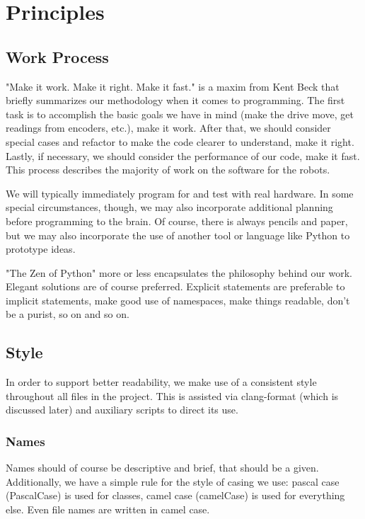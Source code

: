 \section{Principles}
\subsection{Work Process}
"Make it work. Make it right. Make it fast." \cite{bib:makeitworkmakeitright} is a maxim from Kent Beck that briefly summarizes our methodology when it comes to programming. The first task is to accomplish the basic goals we have in mind (make the drive move, get readings from encoders, etc.), make it work. After that, we should consider special cases and refactor to make the code clearer to understand, make it right. Lastly, if necessary, we should consider the performance of our code, make it fast. This process describes the majority of work on the software for the robots. 

We will typically immediately program for and test with real hardware. In some special circumstances, though, we may also incorporate additional planning before programming to the brain. Of course, there is always pencils and paper, but we may also incorporate the use of another tool or language like Python to prototype ideas. 

 "The Zen of Python" \cite{bib:pythonzen} more or less encapsulates the philosophy behind our work. Elegant solutions are of course preferred. Explicit statements are preferable to implicit statements, make good use of namespaces, make things readable, don't be a purist, so on and so on. 

\subsection{Style}
In order to support better readability, we make use of a consistent style throughout all files in the project. This is assisted via clang-format (which is discussed later) and auxiliary scripts to direct its use. 

\subsubsection{Names}
Names should of course be descriptive and brief, that should be a given. Additionally, we have a simple rule for the style of casing we use: pascal case (PascalCase) is used for classes, camel case (camelCase) is used for everything else. Even file names are written in camel case. 

